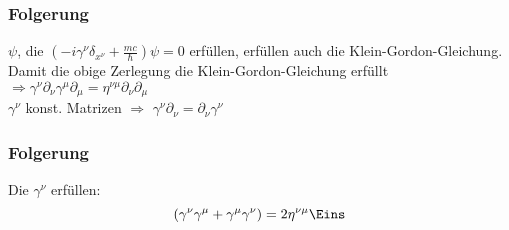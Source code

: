\documentclass[twoside,a4paper]{scrartcl}
\renewcommand{\1}{\mathds{1}}
\newcommand{\Ra}{\Rightarrow}
\begin{document}
\subsubsection*{Folgerung}
$\psi$, die $(-i\gamma^\nu\delta_{x^\nu}+\frac{mc}{\hbar})\psi=0$ erfüllen, erfüllen auch die Klein-Gordon-Gleichung.\\
Damit die obige Zerlegung die Klein-Gordon-Gleichung erfüllt $\Ra \gamma^\nu\partial_\nu \gamma^\mu \partial_\mu=\eta^{\nu \mu} \partial_\nu \partial_\mu$\\
$\gamma^\nu$ konst. Matrizen $\Ra$ $\gamma^\nu \partial_\nu=\partial_\nu \gamma^\nu$ 
\subsubsection*{Folgerung}
Die $\gamma^\nu$ erfüllen:
$$(\gamma^\nu\gamma^\mu+\gamma^\mu\gamma^\nu)=2 \eta^{\nu\mu}\Eins$$
\end{document}
